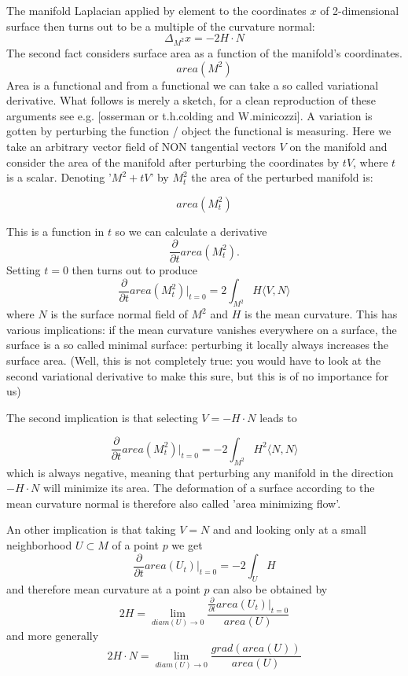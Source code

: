 The manifold Laplacian applied by element to the coordinates $x$ of 2-dimensional surface then turns out to be a multiple of the curvature normal:
\begin{equation} \Delta_{M^2}x= -2H\cdot N \label{eqn::laplaceMeancurve}\end{equation}
The second fact considers surface area as a function of the manifold's coordinates.
\[area(M^2)\]
Area is a functional and from a functional we can take a so called variational derivative. What follows is merely a sketch, for a clean reproduction of these arguments see e.g. [osserman or t.h.colding and W.minicozzi]. A variation is gotten by perturbing the function / object the functional is measuring. Here we take an arbitrary vector field of NON tangential vectors $V$ on the manifold and consider the area of the manifold after perturbing the coordinates by $tV$, where $t$ is a scalar. Denoting '$M^2 + tV$' by $M^2_t$ the area of the perturbed manifold is:

\[area(M^2_t)\]

This is a function in $t$ so we can calculate a derivative
\[\frac{\partial}{\partial t}area(M^2_t).\]
Setting $t=0$ then turns out to produce
\[\frac{\partial}{\partial t}area(M^2_t)|_{t=0} = 2\int_{M^2}H\langle V, N \rangle\]
where $N$ is the surface normal field of $M^2$ and $H$ is the mean curvature. This has various implications: if the mean curvature vanishes everywhere on a surface, the surface is a so called minimal surface: perturbing it locally always increases the surface area. (Well, this is not completely true: you would have to look at the second variational derivative to make this sure, but this is of no importance for us)

The second implication is that selecting $V = -H\cdot N$ leads to

\[\frac{\partial}{\partial t}area(M^2_t)|_{t=0} = -2\int_{M^2}H^2\langle N, N \rangle\]
which is always negative, meaning that perturbing any manifold in the direction $-H\cdot N$ will minimize its area. The deformation of a surface according to the mean curvature normal is therefore also called 'area minimizing flow'.

An other implication is that taking $V= N$ and and looking only at a small neighborhood $U \subset M$ of a point $p$ we get
\[\frac{\partial}{\partial t}area(U_t)|_{t=0} = -2\int_{U}H\]
and therefore mean curvature at a point $p$ can also be obtained by
\[ 2H=\lim_{diam(U) \rightarrow 0}\frac{\frac{\partial}{\partial t}area(U_t)|_{t=0}}{area(U)}\]
and more generally
\[2H\cdot N =\lim_{diam(U) \rightarrow 0}\frac{grad(area(U))}{area(U)}\]

